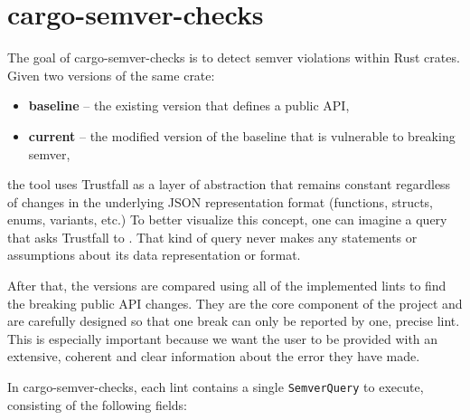 \documentclass[licencjacka,en]{pracamgr}
\begin{document}
\section{cargo-semver-checks}\label{r:section_cargo_semver_checks}

The goal of cargo-semver-checks is to detect semver violations within Rust crates. Given two
versions of the same crate:
\begin{itemize}
	\item \textbf{baseline} -- the existing version that defines a public API,
	\item \textbf{current} -- the modified version of the baseline that is vulnerable to
		breaking semver,
\end{itemize}
the tool uses Trustfall as a layer of abstraction that remains constant regardless of changes in
the underlying JSON representation format (functions, structs, enums, variants, etc.) To better
visualize this concept, one can imagine a query that asks Trustfall to . That kind
of query never makes any statements or assumptions about its data representation or format.

After that, the versions are compared using all of the implemented lints to find the breaking
public API changes. They are the core component of the project and are carefully designed so that
one break can only be reported by one, precise lint. This is especially important because we want
the user to be provided with an extensive, coherent and clear information about the error they
have made.

In cargo-semver-checks, each lint contains a single \texttt{SemverQuery} to execute, consisting of
the following fields:
\end{document}
